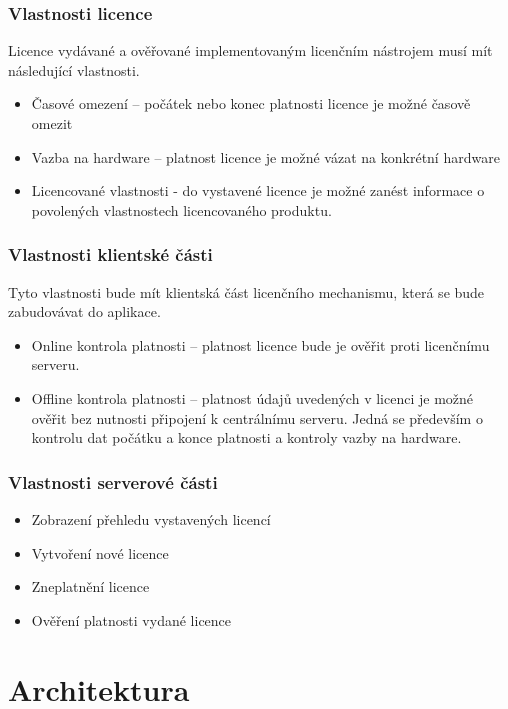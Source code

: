 \subsubsection*{Vlastnosti licence}

Licence vydávané a ověřované implementovaným licenčním nástrojem musí mít
následující vlastnosti.

\begin{itemize}
  \item Časové omezení – počátek nebo konec platnosti licence je možné časově
  omezit
  \item Vazba na hardware – platnost licence je možné vázat na konkrétní
  hardware
  \item Licencované vlastnosti - do vystavené licence je možné zanést
  informace o povolených vlastnostech licencovaného produktu.
\end{itemize}

\subsubsection*{Vlastnosti klientské části}

Tyto vlastnosti bude mít klientská část licenčního mechanismu, která se bude
zabudovávat do aplikace.

\begin{itemize}
  \item Online kontrola platnosti – platnost licence bude je ověřit proti
  licenčnímu serveru.
  \item Offline kontrola platnosti – platnost údajů uvedených v licenci je
  možné ověřit bez nutnosti připojení k centrálnímu serveru. Jedná se především
  o kontrolu dat počátku a konce platnosti a kontroly vazby na hardware.
\end{itemize}

\subsubsection*{Vlastnosti serverové části}

\begin{itemize}
  \item Zobrazení přehledu vystavených licencí
  \item Vytvoření nové licence
  \item Zneplatnění licence
  \item Ověření platnosti vydané licence
\end{itemize}

\section{Architektura}

